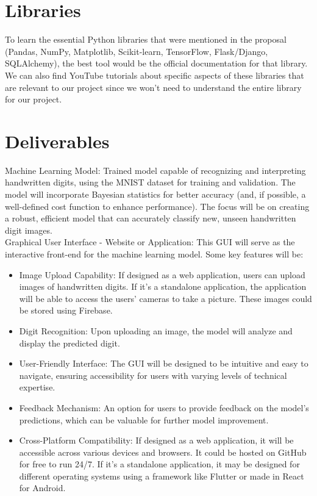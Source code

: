 \documentclass{notes}
\begin{document}
\section{Libraries}
To learn the essential Python libraries that were mentioned in the proposal (Pandas, NumPy, Matplotlib, Scikit-learn, TensorFlow, Flask/Django, SQLAlchemy), the best tool would be the official documentation for that library. We can also find YouTube tutorials about specific aspects of these libraries that are relevant to our project since we won't need to understand the entire library for our project.

\section{Deliverables}
Machine Learning Model: Trained model capable of recognizing and interpreting handwritten digits, using the MNIST dataset for training and validation. The model will incorporate Bayesian statistics for better accuracy (and, if possible, a well-defined cost function to enhance performance). The focus will be on creating a robust, efficient model that can accurately classify new, unseen handwritten digit images. \\
Graphical User Interface - Website or Application: This GUI will serve as the interactive front-end for the machine learning model. Some key features will be:
\begin{itemize}
    \item Image Upload Capability: If designed as a web application, users can upload images of handwritten digits. If it's a standalone application, the application will be able to access the users' cameras to take a picture. These images could be stored using Firebase.
    \item Digit Recognition: Upon uploading an image, the model will analyze and display the predicted digit.
    \item User-Friendly Interface: The GUI will be designed to be intuitive and easy to navigate, ensuring accessibility for users with varying levels of technical expertise.
    \item Feedback Mechanism: An option for users to provide feedback on the model's predictions, which can be valuable for further model improvement.
    \item Cross-Platform Compatibility: If designed as a web application, it will be accessible across various devices and browsers. It could be hosted on GitHub for free to run 24/7. If it's a standalone application, it may be designed for different operating systems using a framework like Flutter or made in React for Android.
\end{itemize}
\end{document}
